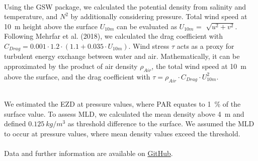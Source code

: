 \documentclass[../Main.tex]{subfiles}
\begin{document}
\\
Using the GSW package, we calculated the potential density from salinity and temperature, and $N^2$ by additionally considering pressure\supercite{gsw}. 
Total wind speed at \SI{10}{m} height above the surface $U_{10m}$ can be evaluated as $U_{10m}$ = $\sqrt[]{u^2 + v^2}$. 
Following Mehrfar et al. (2018), we calculated the drag coefficient with $C_{Drag} = 0.001\cdot1.2\cdot  (1.1+0.035\cdot U_{10m})$. 
Wind stress $\tau$ acts as a proxy for turbulent energy exchange between water and air.
Mathematically, it can be approximated by the product of air density $\rho_{Air}$, the total wind speed at \SI{10}{m} above the surface, and the drag coefficient with $\tau = \rho_{Air}\cdot C_{Drag}\cdot U_{10m}^2$\supercite{Mehrfar2018}.

\\
We estimated the EZD at pressure values, where PAR equates to \SI{1}{\%} of the surface value\supercite{Lee2007}.
To assess MLD, we calculated the mean density above \SI{4}{m} and defined $\SI{0.125}{kg/m^3}$ as threshold difference to the surface. 
We assumed the MLD to occur at pressure values, where mean density values exceed the threshold. 
\\
\\
Data and further information are available on \href{https://github.com/joaldi2208/BloomDynamics}{GitHub}.
\end{document}
